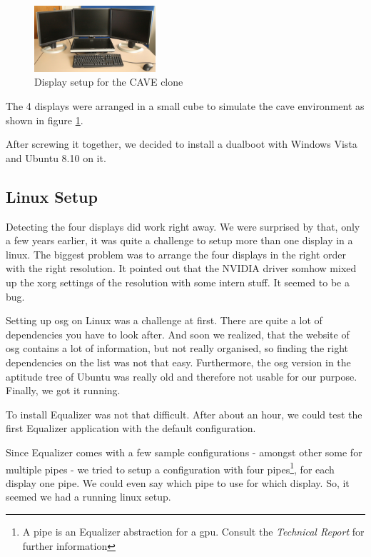 \begin{figure}[H]
	\centering
	\includegraphics[width=0.4\textwidth]{../figures/fotos/display_setup}
	\caption{Display setup for the CAVE clone}
	\label{fig:displaySetup}
\end{figure}

The 4 displays were arranged in a small cube to simulate the \gls{cave} environment as shown in figure \ref{fig:displaySetup}. 

After screwing it together, we decided to install a dualboot with Windows Vista and Ubuntu 8.10 on it. 

\subsection{Linux Setup}
Detecting the four displays did work right away. We were surprised by that, only a few years earlier, it was quite a challenge to setup more than one display in a linux. The biggest problem was to arrange the four displays in the right order with the right resolution. It pointed out that the NVIDIA driver somhow mixed up the xorg settings of the resolution with some intern stuff. It seemed to be a bug.

Setting up \gls{osg} on Linux was a challenge at first. There are quite a lot of dependencies you have to look after. And soon we realized, that the website of \gls{osg} contains a lot of information, but not really organised, so finding the right dependencies on the list was not that easy. Furthermore, the \gls{osg} version in the aptitude tree of Ubuntu was really old and therefore not usable for our purpose. Finally, we got it running.

To install Equalizer was not that difficult. After about an hour, we could test the first Equalizer application with the default configuration.

Since Equalizer comes with a few sample configurations - amongst other some for multiple pipes - we tried to setup a configuration with four pipes\footnote{A pipe is an Equalizer abstraction for a \gls{gpu}. Consult the \emph{Technical Report} for further information}, for each display one pipe. We could even say which pipe to use for which display. So, it seemed we had a running linux setup.

